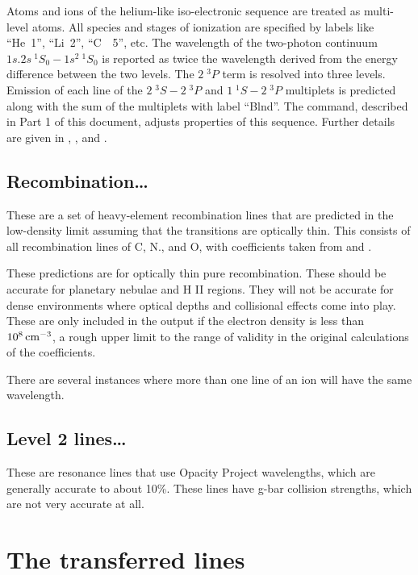 Atoms and ions of the helium-like iso-electronic sequence are treated
as multi-level atoms.  All species and stages of ionization are specified
by labels like ``He~1'', ``Li~2'', ``C~~5'', etc.
The wavelength of the two-photon continuum $1s.2s\ ^1S_0-1s^2\ ^1S_0$ is reported
as twice the wavelength derived from the energy difference between the
two levels. The $2\;^3P$ term is resolved into three levels.
Emission of
each line of the $2\;^3S - 2\;^3P$ and $1\;^1S - 2\;^3P$ multiplets
is predicted along with the sum of
the multiplets with label ``Blnd''.
The  command, described in Part 1 of
this document, adjusts properties of this sequence.
Further details are
given in \citet{Bauman2005}, \citet{Porter2005}, and \citet{PorterFerland2007}.

\subsection{Recombination\dots}

These are a set of heavy-element recombination lines that are predicted
in the low-density limit assuming that the transitions are optically thin.
This consists of all recombination lines of C, N., and O, with coefficients
taken from \citet{Nussbaumer1984} and \citet{Pequignot1991}.

These predictions are for optically thin pure recombination.
These should
be accurate for planetary nebulae and H II regions.
They will not be
accurate for dense environments where optical depths and collisional effects
come into play.
These are only included in the output if the electron
density is less than $10^8 {\rm\thinspace cm^{-3}}$,
a rough upper limit to the range of validity
in the original calculations of the coefficients.

There are several instances where more than one line of an ion will have
the same wavelength.

\subsection{Level 2 lines\dots }

These are resonance lines that use Opacity Project wavelengths, which
are generally accurate to about 10\%.
These lines have g-bar collision
strengths, which are not very accurate at all.

\section{The transferred lines}
\label{sec:TransferredLines}

